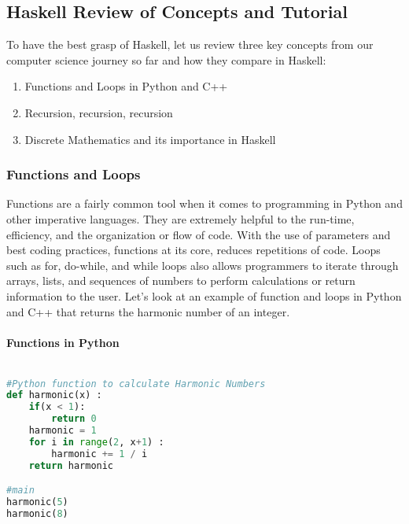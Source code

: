 \documentclass{article}
\begin{document}
\subsection{Haskell Review of Concepts and Tutorial}

To have the best grasp of Haskell, let us review three key concepts from our computer science journey so far and how they compare in Haskell:

\begin{enumerate}
    \item Functions and Loops in Python and C++
    \item Recursion, recursion, recursion
    \item Discrete Mathematics and its importance in Haskell
\end{enumerate}

\subsubsection{Functions and Loops}
Functions are a fairly common tool when it comes to programming in Python and other imperative languages. They are extremely helpful to the run-time, efficiency, and the organization or flow of code. With the use of parameters and best coding practices, functions at its core, reduces repetitions of code. Loops such as for, do-while, and while loops also allows programmers to iterate through arrays, lists, and sequences of numbers to perform calculations or return information to the user. Let's look at an example of function and loops in Python and C++ that returns the harmonic number of an integer. 

\paragraph{Functions in Python}

\begin{lstlisting}[language=Python]

#Python function to calculate Harmonic Numbers
def harmonic(x) :
    if(x < 1):
        return 0
    harmonic = 1
    for i in range(2, x+1) :
        harmonic += 1 / i
    return harmonic

#main
harmonic(5)
harmonic(8)
\end{lstlisting}
\end{document}
